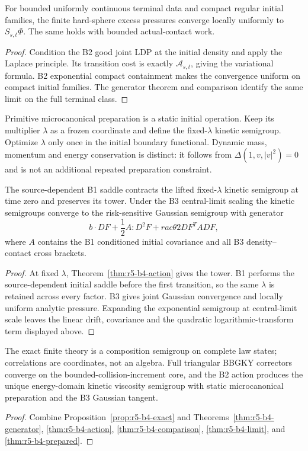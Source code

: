\begin{theorem}
\label{thm:r5-b4-limit}
For bounded uniformly continuous terminal data and compact regular initial
families, the finite hard-sphere excess pressures converge locally uniformly
to \(S_{s,t}\Phi\).  The same holds with bounded actual-contact work.
\end{theorem}

\begin{proof}
Condition the B2 good joint LDP at the initial density and apply the Laplace
principle.  Its transition cost is exactly \(\mathcal A_{s,t}\), giving the
variational formula.  B2 exponential compact containment makes the convergence
uniform on compact initial families.  The generator theorem and comparison
identify the same limit on the full terminal class.
\end{proof}

Primitive microcanonical preparation is a static initial operation.  Keep its
multiplier \(\lambda\) as a frozen coordinate and define the fixed-\(\lambda\)
kinetic semigroup.  Optimize \(\lambda\) only once in the initial boundary
functional.  Dynamic mass, momentum and energy conservation is distinct: it
follows from \(\Delta(1,v,|v|^2)=0\) and is not an additional repeated
preparation constraint.

\begin{theorem}
\label{thm:r5-b4-prepared}
The source-dependent B1 saddle contracts the lifted fixed-\(\lambda\) kinetic
semigroup at time zero and preserves its tower.  Under the B3 central-limit
scaling the kinetic semigroups converge to the risk-sensitive Gaussian
semigroup with generator
\[
 b\cdot DF+\frac12A:D^2F+rac\theta2DF^TADF,
\]
where \(A\) contains the B1 conditioned initial covariance and all B3 density--
contact cross brackets.
\end{theorem}

\begin{proof}
At fixed \(\lambda\), Theorem~\ref{thm:r5-b4-action} gives the tower.  B1
performs the source-dependent initial saddle before the first transition, so
the same \(\lambda\) is retained across every factor.  B3 gives joint Gaussian
convergence and locally uniform analytic pressure.  Expanding the exponential
semigroup at central-limit scale leaves the linear drift, covariance and the
quadratic logarithmic-transform term displayed above.
\end{proof}

\begin{theorem}
\label{thm:r5-b4-main}
The exact finite theory is a composition semigroup on complete law states;
correlations are coordinates, not an algebra.  Full triangular BBGKY
correctors converge on the bounded-collision-increment core, and the B2 action
produces the unique energy-domain kinetic viscosity semigroup with static
microcanonical preparation and the B3 Gaussian tangent.
\end{theorem}

\begin{proof}
Combine Proposition~\ref{prop:r5-b4-exact} and
Theorems~\ref{thm:r5-b4-generator}, \ref{thm:r5-b4-action},
\ref{thm:r5-b4-comparison}, \ref{thm:r5-b4-limit}, and
\ref{thm:r5-b4-prepared}.
\end{proof}
